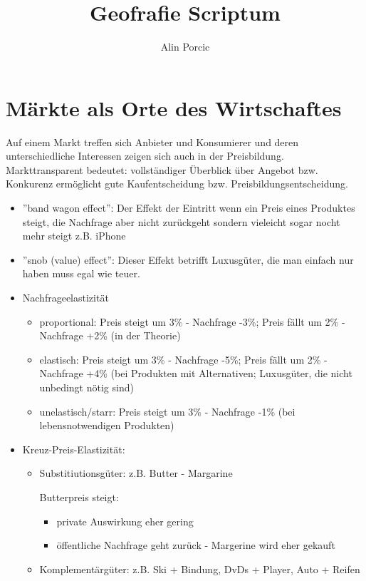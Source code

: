\documentclass[a4paper]{report}
\title{Geofrafie Scriptum}
\author{Alin Porcic}
\begin{document}
\maketitle
\newpage

\tableofcontents
\newpage

\chapter{Märkte als Orte des Wirtschaftes}

Auf einem Markt treffen sich Anbieter und Konsumierer und deren unterschiedliche Interessen zeigen sich auch in der Preisbildung. Markttransparent bedeutet: vollständiger Überblick über Angebot bzw. Konkurenz ermöglicht gute Kaufentscheidung bzw. Preisbildungsentscheidung.


	\begin{itemize}
	\item ''band wagon effect'': Der Effekt der Eintritt wenn ein Preis eines Produktes steigt, die Nachfrage aber nicht zurückgeht sondern vieleicht sogar
	nocht mehr steigt z.B. iPhone
	
	\item ''snob (value) effect'': Dieser Effekt betrifft Luxusgüter, die man einfach nur haben muss egal wie teuer.
	
	\item Nachfrageelastizität
		\begin{itemize}
		\item proportional: Preis steigt um 3\% - Nachfrage -3\%; Preis fällt um 2\% - Nachfrage +2\% (in der Theorie)
		\item elastisch: Preis steigt um 3\% - Nachfrage -5\%; Preis fällt um 2\% - Nachfrage +4\% (bei Produkten mit Alternativen; Luxusgüter, die nicht
		unbedingt nötig sind)
		\item unelastisch/starr: Preis steigt um 3\% - Nachfrage -1\% (bei lebensnotwendigen Produkten)
		\end{itemize}
	
	\item Kreuz-Preis-Elastizität:
		\begin{itemize}
		\item Substitiutionsgüter: z.B. Butter - Margarine
		
		Butterpreis steigt:
			\begin{itemize}
			\item private Auswirkung eher gering
			\item öffentliche Nachfrage geht zurück - Margerine wird eher gekauft
			\end{itemize}
			
		\item Komplementärgüter: z.B. Ski + Bindung, DvDs + Player, Auto + Reifen
			
		\end{itemize}
	\end{itemize}
\end{document}
